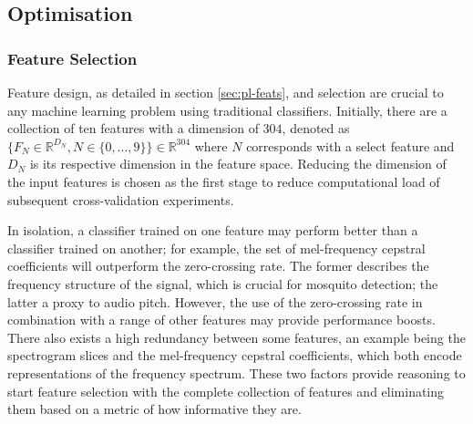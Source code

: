     \subsection{Optimisation}
    \label{subsec:exp-clf-opt}
    
        \subsubsection{Feature Selection}
        \label{subsubsec:exp-clf-opt-featsel}
            Feature design, as detailed in section \ref{sec:pl-feats}, and selection are crucial to any machine learning problem using traditional classifiers. Initially, there are a collection of ten features with a dimension of $304$, denoted as $\{F_{N}\in\mathbb{R}^{D_{N}},N\in\{0,...,9\}\}\in\mathbb{R}^{304}$ where $N$ corresponds with a select feature and $D_N$ is its respective dimension in the feature space. Reducing the dimension of the input features is chosen as the first stage to reduce computational load of subsequent cross-validation experiments.
            
            In isolation, a classifier trained on one feature may perform better than a classifier trained on another; for example, the set of mel-frequency cepstral coefficients will outperform the zero-crossing rate. The former describes the frequency structure of the signal, which is crucial for mosquito detection; the latter a proxy to audio pitch. However, the use of the zero-crossing rate in combination with a range of other features may provide performance boosts. There also exists a high redundancy between some features, an example being the spectrogram slices and the mel-frequency cepstral coefficients, which both encode representations of the frequency spectrum. These two factors provide reasoning to start feature selection with the complete collection of features and eliminating them based on a metric of how informative they are. 
            
